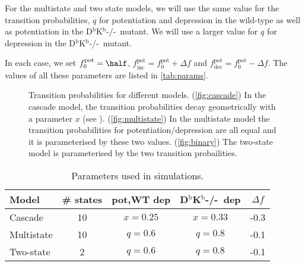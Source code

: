 \documentclass[12pt]{article}
\newcommand{\pot}{^{\text{pot}}}
\newcommand{\norm}{_0}
\newcommand{\inc}{_{\text{inc}}}
\newcommand{\dec}{_{\text{dec}}}
\newcommand{\Kn}{D$^\mathrm{b}$K$^\mathrm{b}$-/-}
\begin{document}
For the multistate and two state models, we will use the same value for the transition probabilities, $q$ for potentiation and depression in the wild-type as well as potentiation in the \Kn\ mutant. 
We will use a larger value for $q$ for depression in the \Kn\ mutant.

In each case, we set $f\pot\norm=\half$, $f\pot\inc=f\pot\norm+\Delta f$ and $f\pot\dec=f\pot\norm-\Delta f$. The values of all these parameters are listed in \autoref{tab:params}.

\begin{figure}
 \begin{center}
 \begin{myenuma}
  \item{}\label{fig:cascade}\hspace{0.5cm}
  \item{}\label{fig:multistate}\hspace{0.5cm}
  \item{}\label{fig:binary}
 \end{myenuma}
 \end{center}
  \caption{Transition probabilities for different models. 
  (\ref{fig:cascade}) In the cascade model, the transition probabilities decay geometrically with a parameter $x$ (see \cite{Fusi2005cascade}).
  (\ref{fig:multistate}) In the multistate model the transition probabilities for potentiation/depression are all equal and it is parameterised by these two values.
  (\ref{fig:binary}) The two-state model is parameterised by the two transition probailities.}\label{fig:models}
\end{figure}

\begin{table}
 \begin{center}
  \begin{tabular}{|l|c|c|c|c|}
    \hline
    Model & \# states & pot,WT dep & \Kn\ dep & $\Delta f$\\
    \hline
    Cascade    & 10 & $x=0.25$ & $x=0.33$ & -0.3 \\
    Multistate & 10 & $q=0.6$  & $q=0.8$  & -0.1 \\
    Two-state  & 2  & $q=0.6$  & $q=0.8$  & -0.1 \\
    \hline
  \end{tabular}
 \end{center}
  \caption{Parameters used in simulations.}\label{tab:params}
\end{table}
\end{document}
